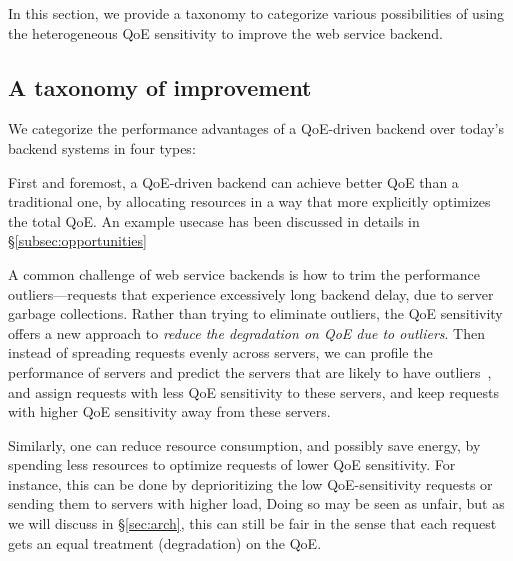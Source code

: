 In this section, we provide a taxonomy to categorize various possibilities of using the heterogeneous QoE sensitivity to improve the web service backend.%

\subsection{A taxonomy of improvement}

We categorize the performance advantages of a QoE-driven backend over today's backend systems in four types:

First and foremost, a QoE-driven backend can achieve better QoE than a traditional one, by allocating resources in a way that more explicitly optimizes the total QoE. 
An example usecase has been discussed in details in \S\ref{subsec:opportunities}
    
A common challenge of web service backends is how to trim the performance outliers---requests that experience excessively long backend delay, \eg due to server garbage collections. 
Rather than trying to eliminate outliers, the QoE sensitivity offers a new approach to {\em reduce the degradation on QoE due to outliers}.
Then instead of spreading requests evenly across servers, we can profile the performance of servers and predict the servers that are likely to have outliers~\cite{ganesh's trimming}, and assign requests with less QoE sensitivity to these servers, and keep requests with higher QoE sensitivity away from these servers. 
    
Similarly, one can reduce resource consumption, and possibly save energy, by spending less resources to optimize requests of lower QoE sensitivity. For instance, this can be done by deprioritizing the low QoE-sensitivity requests or sending them to servers with higher load, 
Doing so may be seen as unfair, but as we will discuss in \S\ref{sec:arch}, this can still be fair in the sense that each request gets an equal treatment (degradation) on the QoE.
    

